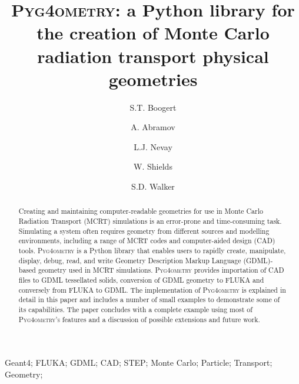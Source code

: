 \documentclass[final,5p,times,twocolumn]{elsarticle}
\newcommand{\PYGEOMETRY}{\textsc{Pyg4ometry}}
\newcommand{\PYGEOMETRYPOS}{\textsc{Pyg4ometry's}} %
\begin{document}
\begin{frontmatter}



\title{\PYGEOMETRY{}: a Python library for the creation of Monte Carlo radiation transport physical geometries}


\author[a]{S.T. Boogert}
\author[a]{A. Abramov}
\author[a]{L.J. Nevay}
\author[a]{W. Shields}
\author[a]{S.D. Walker}

\address[a]{John Adams Institute at Royal Holloway, Department of Physics, Royal Holloway, Egham, TW20 0EX, Surrey, UK}

\begin{abstract}
Creating and maintaining computer-readable geometries for use in Monte Carlo Radiation Transport (MCRT) simulations is an
error-prone and time-consuming task. Simulating a system often requires geometry from different sources and modelling
environments, including a range of MCRT codes and computer-aided design (CAD) tools. \PYGEOMETRY{} is a Python library
that enables users to rapidly create, manipulate, display, debug, read, and write Geometry Description Markup Language (GDML)-based
geometry used in MCRT simulations. \PYGEOMETRY{} provides importation of CAD files to GDML tessellated solids, conversion of GDML geometry
to FLUKA and conversely from FLUKA to GDML. The implementation of \PYGEOMETRY{} is explained in detail in this paper and includes a number of small
examples to demonstrate some of its capabilities. The paper concludes with a complete example using most of \PYGEOMETRYPOS{} features and a discussion of possible
extensions and future work.
\end{abstract}

\begin{keyword}
Geant4; FLUKA; GDML; CAD; STEP; Monte Carlo; Particle; Transport; Geometry;

\end{keyword}

\end{frontmatter}
\end{document}
